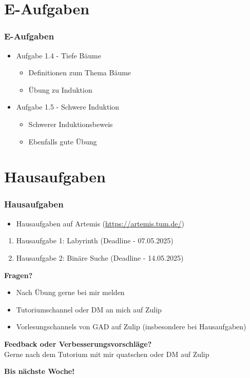 \documentclass{beamer}
\begin{document}
\section{E-Aufgaben}
\begin{frame}
	\frametitle{E-Aufgaben}
	\begin{itemize}
		\item Aufgabe 1.4 - Tiefe Bäume \\
		      \begin{itemize}
			      \item Definitionen zum Thema Bäume
			      \item Übung zu Induktion
		      \end{itemize}
		\item Aufgabe 1.5 - Schwere Induktion
		      \begin{itemize}
			      \item Schwerer Induktionsbeweis
			      \item Ebenfalls gute Übung
		      \end{itemize}
	\end{itemize}
\end{frame}

\section{Hausaufgaben}
\begin{frame}
	\frametitle{Hausaufgaben}
	\begin{itemize}
		\item Hausaufgaben auf Artemis (\url{https://artemis.tum.de/})
	\end{itemize}
	\begin{enumerate}
		\item Hausaufgabe 1: Labyrinth (Deadline - 07.05.2025)
		\item Hausaufgabe 2: Binäre Suche (Deadline - 14.05.2025)
	\end{enumerate}
\end{frame}

\begin{frame}
	\textbf{Fragen?}
	\begin{itemize}
		\item Nach Übung gerne bei mir melden
		\item Tutoriumschannel oder DM an mich auf Zulip
		\item Vorlesungschannels von GAD auf Zulip (insbesondere bei Hausaufgaben)
	\end{itemize}

	\medskip
	\textbf{Feedback oder Verbesserungsvorschläge?} \\
	Gerne nach dem Tutorium mit mir quatschen oder DM auf Zulip

	\medskip
	\textbf{Bis nächste Woche!}
\end{frame}

\end{document}
